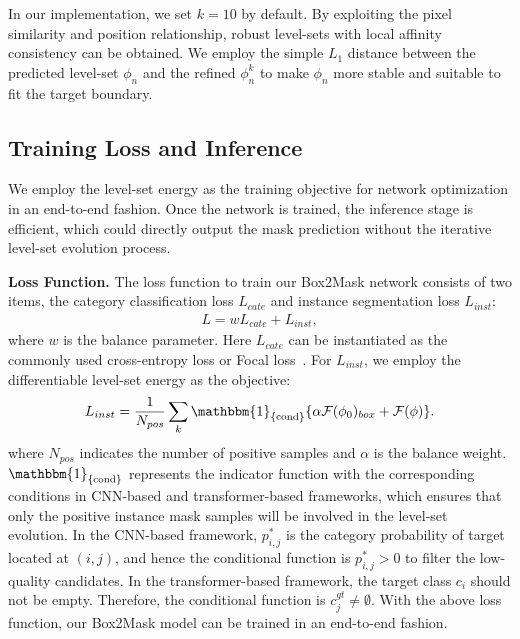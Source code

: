 \documentclass[12pt,onecolumn,letterpaper]{article}
\begin{document}
\noindent 
In our implementation, we set $k=10 $ by default. By exploiting the pixel similarity and position relationship, robust level-sets with local affinity consistency can be obtained. We employ the simple $L_1$ distance between the predicted level-set $\phi _n$ and the refined $\phi _{n}^k$ to make  $\phi _n$ more stable and suitable to fit the target boundary.

\subsection{Training Loss and Inference}
We employ the level-set energy as the training objective for network optimization in an end-to-end fashion. Once the network is trained, the inference stage is efficient, which could directly output the mask prediction without the iterative level-set evolution process.

\textbf{Loss Function.} 
The loss function to train our Box2Mask network consists of two items, the category classification loss $L_{cate}$ and instance segmentation loss $L_{inst}$: 
\begin{equation} \label{loss}
	\begin{aligned}
		L = w{L_{cate}} + {L_{inst}},
	\end{aligned}
\end{equation}
where $w$ is the balance parameter. Here $L_{cate}$ can be instantiated as the commonly used cross-entropy loss or Focal loss~\cite{lin2017focal}. 
For $L_{inst}$, we employ the differentiable level-set energy as the objective: 
\begin{equation} \label{levelsetloss}
	\begin{aligned}
{L_{inst}} = \frac{1}{{{N_{pos}}}}\sum\limits_k {{\mathbbm{1}_{\{\text{cond}\}}}\{ }    \alpha \mathcal{F}{({\phi _0})_{box}} +  \mathcal{F}(\phi )\}.
	\end{aligned}
\end{equation}
where $N_{pos}$ indicates the number of positive samples and $\alpha$ is the balance weight. $\mathbbm{1}_{\{\text{cond}\}}$ represents the indicator function with the corresponding conditions in CNN-based and transformer-based frameworks, which ensures that only the positive instance mask samples will be involved in the level-set evolution.
In the CNN-based framework,  $p_{i,j}^*$ is the category probability of target located at $(i,j)$, and hence the conditional function is $p_{i,j}^* > 0 $ to filter the low-quality candidates.
In the transformer-based framework, the target class $c_i$ should not be empty. Therefore, the conditional function is  $c_j^{gt} \ne \emptyset$. With the above loss function, our Box2Mask model can be trained in an end-to-end fashion.
\end{document}
